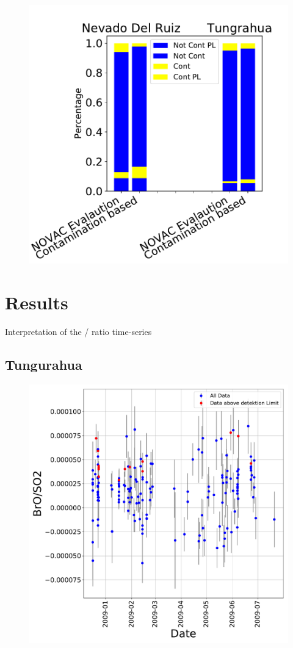 \documentclass  [
  paper    = a4,
  BCOR     = 10mm,
  twoside,
  fontsize = 12pt,
  fleqn,
  toc      = bibnumbered,
  toc      = listofnumbered,
  numbers  = noendperiod,
  headings = normal,
  listof   = leveldown,
  version  = 3.03
]                                       {scrreprt}
\begin{document}
\begin{figure}
	\centering
	\includegraphics[width=0.7\linewidth]{Bilder/BarPlot}
	\caption{}
	\label{fig:barplot}
\end{figure}

	\chapter{Results}
	Interpretation of the / ratio time-series
	\section{Tungurahua}
	\begin{figure}
		\centering
		\includegraphics[width=0.7\linewidth]{Bilder/Results/Results_Tungurahua}
		\caption{}
		\label{fig:resultstungurahua}
	\end{figure}
	
\end{document}
